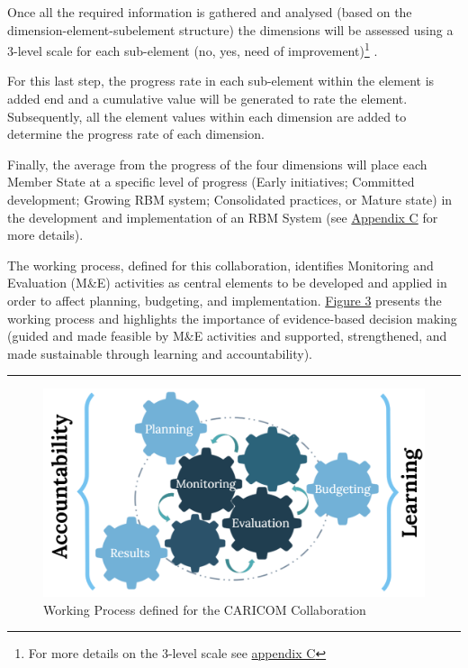 \documentclass[
  10pt,
]{book}
\begin{document}
Once all the required information is gathered and analysed (based on the dimension-element-subelement structure) the dimensions will be assessed using a 3-level scale for each sub-element (no, yes, need of improvement)\footnote{For more details on the 3-level scale see \protect\hyperlink{appendixC}{appendix C}} .

For this last step, the progress rate in each sub-element within the element is added end and a cumulative value will be generated to rate the element. Subsequently, all the element values within each dimension are added to determine the progress rate of each dimension.

Finally, the average from the progress of the four dimensions will place each Member State at a specific level of progress (Early initiatives; Committed development; Growing RBM system; Consolidated practices, or Mature state) in the development and implementation of an RBM System (see \protect\hyperlink{appendixC}{Appendix C} for more details).

The working process, defined for this collaboration, identifies Monitoring and Evaluation (M\&E) activities as central elements to be developed and applied in order to affect planning, budgeting, and implementation. \protect\hyperlink{fig:figure3}{Figure 3} presents the working process and highlights the importance of evidence-based decision making (guided and made feasible by M\&E activities and supported, strengthened, and made sustainable through learning and accountability).

\begin{center}\rule{0.5\linewidth}{0.5pt}\end{center}

\begin{figure}

{\centering \includegraphics[width=1\linewidth]{./images/figure_3} 

}

\caption{Working Process defined for the CARICOM Collaboration}\label{fig:figure3}
\end{figure}
\end{document}
